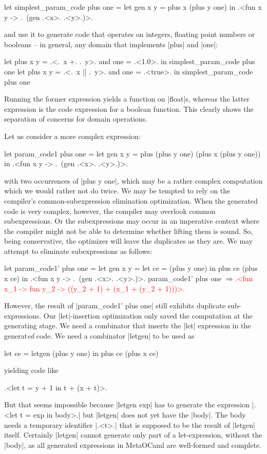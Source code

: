 \documentclass{elsart}
\newcommand{\evalresult}[1]{\ensuremath{\Longrightarrow}\textcolor{red}{#1}}
\begin{document}
\begin{code}
let simplest_param_code plus one =
  let gen x y = plus x (plus y one) in
  .<fun x y -> .~(gen .<x>. .<y>.)>.
\end{code}
and use it to generate code that operates on integers, floating point
numbers or booleans -- in general, any domain that implements |plus|
and |one|:
\begin{code}
let plus x y = .<.~x +. .~y>. and one = .<1.0>. in
  simplest_param_code plus one
let plus x y = .<.~x || .~y>. and one = .<true>. in
  simplest_param_code plus one
\end{code}
Running the former expression yields a function on |float|s, whereas
the latter expression is the code expression for a boolean function.
This clearly shows the separation of concerns for domain
operations.

Let us consider a more complex expression:
\begin{code}
let param_code1 plus one =
  let gen x y = plus (plus y one) (plus x (plus y one)) in
  .<fun x y -> .~(gen .<x>. .<y>.)>.
\end{code}
with two occurrences of |plus y one|,
which may be a rather complex computation which we would rather not do
twice. We may be tempted to rely on the compiler's
common-subexpression elimination optimization. When the generated code is
very complex, however, the compiler may overlook common subexpressions.  Or the
subexpressions may occur in an imperative context where the compiler
might not be able to determine whether lifting them is sound. So, being
conservative, the optimizer will leave the duplicates as they are. 
We may attempt to eliminate subexpressions as follows: 
\begin{code}[commandchars=\\\{\}]
let param_code1' plus one =
  let gen x y = let ce = (plus y one) in  plus ce (plus x ce) in
  .<fun x y -> .~(gen .<x>. .<y>.)>.
param_code1' plus one
\evalresult{.<fun x_1 -> fun y_2 -> ((y_2 + 1) + (x_1 + (y_2 + 1)))>.}
\end{code}
However,
the result of |param_code1' plus one| still exhibits duplicate
sub-expressions.  Our |let|-insertion optimization only saved the
computation at the generating stage.  We need a combinator that
inserts the |let| expression in the generat\emph{ed} code. We need a
combinator |letgen| to be used as
\begin{code}
let ce = letgen (plus y one) in plus ce (plus x ce)
\end{code}
yielding code like 
\begin{code}
.<let t = y + 1 in t + (x + t)>.
\end{code}
But that seems impossible because |letgen exp| has to generate
the expression |.<let t = exp in body>.| but |letgen| does not yet
have the |body|. The body needs a temporary identifier |.<t>.|
that is supposed to be the result of |letgen| itself.  Certainly
|letgen| cannot generate only part of a let-expression, without the
|body|, as all generated expressions in MetaOCaml are well-formed and
complete.
\end{document}
